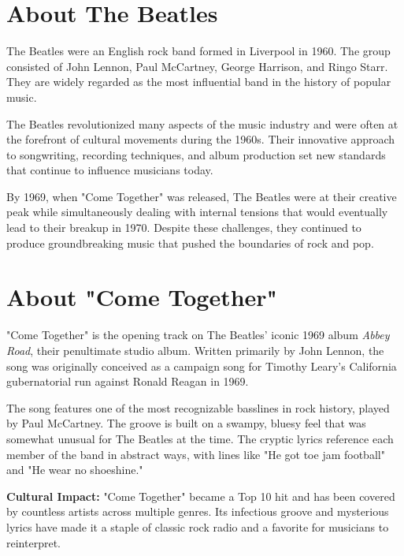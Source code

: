 \documentclass[11pt,letterpaper]{article}
\begin{document}
\restoregeometry

\newpage

\section*{About The Beatles}

The Beatles were an English rock band formed in Liverpool in 1960. The group consisted of John Lennon, Paul McCartney, George Harrison, and Ringo Starr. They are widely regarded as the most influential band in the history of popular music.

The Beatles revolutionized many aspects of the music industry and were often at the forefront of cultural movements during the 1960s. Their innovative approach to songwriting, recording techniques, and album production set new standards that continue to influence musicians today.

By 1969, when "Come Together" was released, The Beatles were at their creative peak while simultaneously dealing with internal tensions that would eventually lead to their breakup in 1970. Despite these challenges, they continued to produce groundbreaking music that pushed the boundaries of rock and pop.

\vspace{0.5cm}

\section*{About "Come Together"}

"Come Together" is the opening track on The Beatles' iconic 1969 album \textit{Abbey Road}, their penultimate studio album. Written primarily by John Lennon, the song was originally conceived as a campaign song for Timothy Leary's California gubernatorial run against Ronald Reagan in 1969.

The song features one of the most recognizable basslines in rock history, played by Paul McCartney. The groove is built on a swampy, bluesy feel that was somewhat unusual for The Beatles at the time. The cryptic lyrics reference each member of the band in abstract ways, with lines like "He got toe jam football" and "He wear no shoeshine."

\textbf{Cultural Impact:} "Come Together" became a Top 10 hit and has been covered by countless artists across multiple genres. Its infectious groove and mysterious lyrics have made it a staple of classic rock radio and a favorite for musicians to reinterpret.
\end{document}
